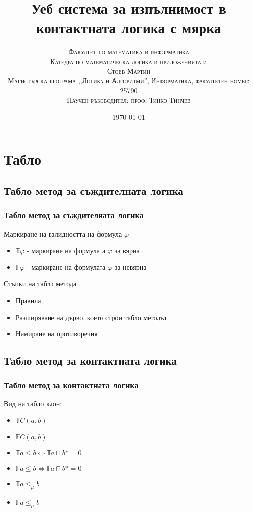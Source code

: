 \documentclass{beamer}
\newcommand{\signT}{\mathbb{T}}
\newcommand{\signF}{\mathbb{F}}
\begin{document}
\title{Уеб система за изпълнимост в контактната логика с мярка}  
\author{\textsc{Факултет по математика и информатика} \\
	\textsc{Катедра по математическа логика и приложенията ѝ} \\ [3mm]
	\textsc{Стоев Мартин} \\ [3mm]
	\textsc{Магистърска програма ,,Логика и Алгоритми'', Информатика, факултетен номер: 25790} \\ [4mm]
	\small\textsc{Научен ръководител: проф. Тинко Тинчев}}
\date{\today} 
\begin{frame}
\titlepage
\end{frame}


\section{Табло}
\subsection{Табло метод за съждителната логика}
\begin{frame}\frametitle{Табло метод за съждителната логика}
Маркиране на валидността на формула $\varphi$
\begin{itemize}
	\item $\signT \varphi$ - маркиране на формулата $\varphi$ за вярна
	\item $\signF \varphi$ - маркиране на формулата $\varphi$ за невярна
\end{itemize}
\vspace{20px}
Стъпки на табло метода
\begin{itemize}
	\item Правила
	\item Разширяване на дърво, което строи табло методът
	\item Намиране на противоречия
\end{itemize}
\end{frame}

\subsection{Табло метод за контактната логика}
\begin{frame}\frametitle{Табло метод за контактната логика}
Вид на табло клон:
\begin{itemize}
	\item $\signT C(a, b)$
	\item $\signF C(a, b)$ 
	\item $\signT a \leq b \iff \signT a \sqcap b* = 0$
	\item $\signF a \leq b \iff \signF a \sqcap b* = 0$
	\item $\signT a  \le_\mu b$
	\item $\signF a \le_\mu b$
\end{itemize}
\end{frame}
\end{document}
